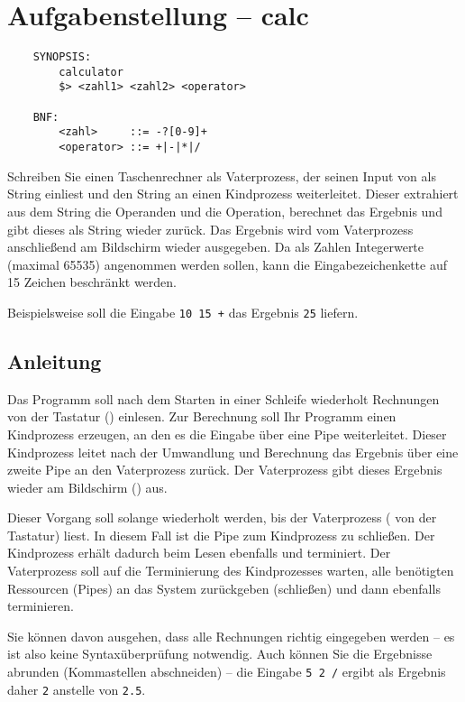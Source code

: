 




\section*{Aufgabenstellung -- calc}

\begin{verbatim}
    SYNOPSIS:
        calculator
        $> <zahl1> <zahl2> <operator>

    BNF:
        <zahl>     ::= -?[0-9]+
        <operator> ::= +|-|*|/
\end{verbatim}

Schreiben Sie einen Taschenrechner als Vaterprozess, der seinen Input
von  als String einliest und den String an einen
Kindprozess weiterleitet. Dieser extrahiert aus dem String die
Operanden und die Operation, berechnet das Ergebnis und gibt dieses
als String wieder zurück. Das Ergebnis wird vom Vaterprozess
anschließend am Bildschirm wieder ausgegeben. Da als Zahlen
Integerwerte (maximal 65535) angenommen werden sollen, kann die
Eingabezeichenkette auf 15 Zeichen beschränkt werden.

Beispielsweise soll die Eingabe \verb_10 15 +_ das Ergebnis \verb_25_
liefern.

\subsection*{Anleitung}

Das Programm soll nach dem Starten in einer Schleife wiederholt
Rechnungen von der Tastatur () einlesen. Zur
Berechnung soll Ihr Programm einen Kindprozess erzeugen, an den
es die Eingabe über eine Pipe weiterleitet. Dieser Kindprozess
leitet nach der Umwandlung und Berechnung das Ergebnis über eine
zweite Pipe an den Vaterprozess zurück. Der Vaterprozess
gibt dieses Ergebnis wieder am Bildschirm () aus.

Dieser Vorgang soll solange wiederholt werden, bis der Vaterprozess
 ( von der Tastatur) liest.
In diesem Fall ist die Pipe zum Kindprozess zu schließen. Der
Kindprozess erhält dadurch beim Lesen ebenfalls 
und terminiert. Der Vaterprozess soll auf die Terminierung des
Kindprozesses warten, alle benötigten Ressourcen (Pipes) an das
System zurückgeben (schließen) und dann ebenfalls terminieren.

Sie können davon ausgehen, dass alle Rechnungen richtig eingegeben
werden -- es ist also keine Syntaxüberprüfung notwendig. Auch können
Sie die Ergebnisse abrunden (Kommastellen abschneiden) -- die Eingabe
\verb_5 2 /_ ergibt als Ergebnis daher \verb_2_ anstelle von
\verb_2.5_.

\osueguidelinestwo


